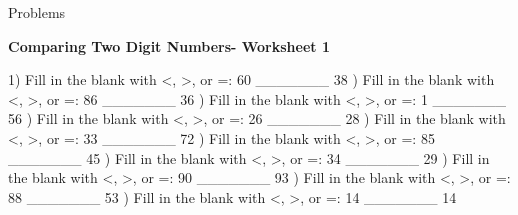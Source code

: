\documentclass{article}%
\begin{document}
%
\huge%
\vspace*{\fill}%
\begin{center}%
Problems%
\end{center}%
\vspace*{\fill}%
\pagebreak%
\normalsize%
\large%
\begin{center}%
\textbf{Comparing Two Digit Numbers- Worksheet 1}%
\newline%
\newline%
\newline%
\end{center} \normalsize%
1) Fill in the blank with <, >, or =: 60 \_\_\_\_\_\_\_ 38%
\newline%
\newline%
) Fill in the blank with <, >, or =: 86 \_\_\_\_\_\_\_ 36%
\newline%
\newline%
) Fill in the blank with <, >, or =: 1 \_\_\_\_\_\_\_ 56%
\newline%
\newline%
) Fill in the blank with <, >, or =: 26 \_\_\_\_\_\_\_ 28%
\newline%
\newline%
) Fill in the blank with <, >, or =: 33 \_\_\_\_\_\_\_ 72%
\newline%
\newline%
) Fill in the blank with <, >, or =: 85 \_\_\_\_\_\_\_ 45%
\newline%
\newline%
) Fill in the blank with <, >, or =: 34 \_\_\_\_\_\_\_ 29%
\newline%
\newline%
) Fill in the blank with <, >, or =: 90 \_\_\_\_\_\_\_ 93%
\newline%
\newline%
) Fill in the blank with <, >, or =: 88 \_\_\_\_\_\_\_ 53%
\newline%
\newline%
) Fill in the blank with <, >, or =: 14 \_\_\_\_\_\_\_ 14%
\newline%
\newline%
\end{document}
